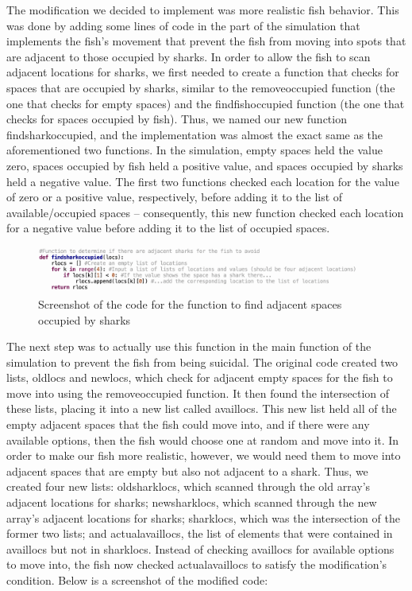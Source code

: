\documentclass[12pt]{iopart} %
\begin{document}
The modification we decided to implement was more realistic fish behavior. 
This was done by adding some lines of code in the part of the simulation that implements the fish’s movement that prevent the fish from moving into spots that are adjacent to those occupied by sharks. 
In order to allow the fish to scan adjacent locations for sharks, we first needed to create a function that checks for spaces that are occupied by sharks, similar to the removeoccupied function (the one that checks for empty spaces) and the findfishoccupied function (the one that checks for spaces occupied by fish). 
Thus, we named our new function findsharkoccupied, and the implementation was almost the exact same as the aforementioned two functions. 
In the simulation, empty spaces held the value zero, spaces occupied by fish held a positive value, and spaces occupied by sharks held a negative value. 
The first two functions checked each location for the value of zero or a positive value, respectively, before adding it to the list of available/occupied spaces – consequently, this new function checked each location for a negative value before adding it to the list of occupied spaces.


\begin{figure}[htbp]
  \begin{center}
  \item[]\includegraphics[width=0.95\textwidth]{findSharkOccupied.png}
  \caption{\label{fig:findSharkOccupied}
  Screenshot of the code for the function to find adjacent spaces occupied by sharks
  }
  \end{center}
\end{figure}


The next step was to actually use this function in the main function of the simulation to prevent the fish from being suicidal. 
The original code created two lists, oldlocs and newlocs, which check for adjacent empty spaces for the fish to move into using the removeoccupied function. 
It then found the intersection of these lists, placing it into a new list called availlocs. 
This new list held all of the empty adjacent spaces that the fish could move into, and if there were any available options, then the fish would choose one at random and move into it. 
In order to make our fish more realistic, however, we would need them to move into adjacent spaces that are empty but also not adjacent to a shark. 
Thus, we created four new lists: oldsharklocs, which scanned through the old array’s adjacent locations for sharks; newsharklocs, which scanned through the new array’s adjacent locations for sharks; sharklocs, which was the intersection of the former two lists; and actualavaillocs, the list of elements that were contained in availlocs but not in sharklocs. 
Instead of checking availlocs for available options to move into, the fish now checked actualavaillocs to satisfy the modification’s condition. 
Below is a screenshot of the modified code:
\end{document}
